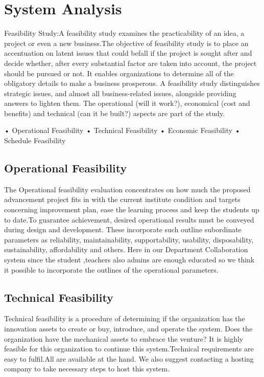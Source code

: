 \documentclass{article}
\begin{document}
 \section{System Analysis}
 Feasibility Study:A feasibility study examines the practicability of an idea, a project or even a new business.The objective of feasibility study is to place an accentuation on latent issues that could befall if the project is sought after and decide whether, after every substantial factor are taken into account, the project should be pursued or not. It enables organizations to determine all of the obligatory details to make a business prosperous. A feasibility study distinguishes strategic issues, and almost all business-related issues, alongside providing answers to lighten them. The operational (will it work?), economical (cost and benefits) and technical (can it be built?) aspects are part of the study.
 
    • Operational Feasibility
    • Technical Feasibility
    • Economic Feasibility
    • Schedule Feasibility

 

\subsection{Operational Feasibility}
The  Operational  feasibility  evaluation  concentrates   on  how  much  the  proposed
advancement project fits  in with the current institute condition and targets concerning
improvement plan, ease the learning process and keep the students up to date.To guarantee achievement, desired operational results must be conveyed during design and development. These incorporate such outline subordinate parameters as reliability, maintainability, supportability, usability, disposability, sustainability, affordability and others.
Here in our Department Collaboration system since the student ,teachers also admins are enough educated so we think it possible to incorporate the outlines of the operational parameters.

\subsection{Technical Feasibility}
Technical feasibility is a procedure of determining if the organization has the innovation
assets to create or buy, introduce, and operate the system. Does the organization have the
mechanical assets to embrace the venture?
It is highly feasible for this organization to continue this system.Technical requirements are easy to fulfil.All are available at the hand. We also suggest contacting a hosting company to take necessary steps to host this system.
\end{document}
